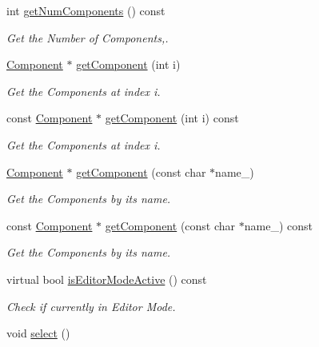 \begin{DoxyCompactItemize}
\item 
int \hyperlink{class_magnum_1_1_component_1_1_owner_a936488a8c0a2e5eca370ca4112be7f11}{get\+Num\+Components} () const 
\begin{DoxyCompactList}\small\item\em Get the Number of Components,. \end{DoxyCompactList}\item 
\hyperlink{class_magnum_1_1_component}{Component} $\ast$ \hyperlink{class_magnum_1_1_component_1_1_owner_abed74294c87ac3b84663441feb20f5a7}{get\+Component} (int i)
\begin{DoxyCompactList}\small\item\em Get the Components at index i. \end{DoxyCompactList}\item 
const \hyperlink{class_magnum_1_1_component}{Component} $\ast$ \hyperlink{class_magnum_1_1_component_1_1_owner_aa658bf4938f0216a0db979c6324f9666}{get\+Component} (int i) const 
\begin{DoxyCompactList}\small\item\em Get the Components at index i. \end{DoxyCompactList}\item 
\hyperlink{class_magnum_1_1_component}{Component} $\ast$ \hyperlink{class_magnum_1_1_component_1_1_owner_a098a31b0eb76e8f6c661cd9542866a3d}{get\+Component} (const char $\ast$name\+\_\+)
\begin{DoxyCompactList}\small\item\em Get the Components by its name. \end{DoxyCompactList}\item 
const \hyperlink{class_magnum_1_1_component}{Component} $\ast$ \hyperlink{class_magnum_1_1_component_1_1_owner_ab574cb2132f012f7400ef489aefa4005}{get\+Component} (const char $\ast$name\+\_\+) const 
\begin{DoxyCompactList}\small\item\em Get the Components by its name. \end{DoxyCompactList}\item 
virtual bool \hyperlink{class_magnum_1_1_component_1_1_owner_abf13c26d4fc4c07fad6893aac99bad3d}{is\+Editor\+Mode\+Active} () const 
\begin{DoxyCompactList}\small\item\em Check if currently in Editor Mode. \end{DoxyCompactList}\item 
void \hyperlink{class_magnum_1_1_component_1_1_owner_a87291f87dfe3a340fd4983ccfcfa9c50}{select} ()\hypertarget{class_magnum_1_1_component_1_1_owner_a87291f87dfe3a340fd4983ccfcfa9c50}{}\label{class_magnum_1_1_component_1_1_owner_a87291f87dfe3a340fd4983ccfcfa9c50}


\end{DoxyCompactItemize}
